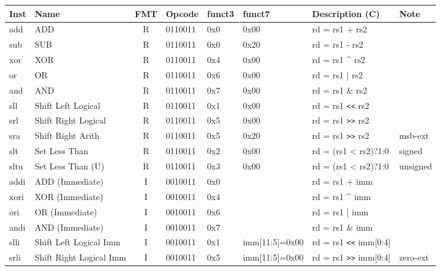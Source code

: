 \begin{tabular}
{T | l | c | T | T | T | T | l} \hline
\rm Inst & Name                    & FMT & \rm Opcode & \rm funct3 & \rm funct7 & \rm Description (C)  & Note \\ \hline
add      & ADD                     & R   & 0110011    & 0x0    & 0x00   & rd = rs1 + rs2               & \\
sub      & SUB                     & R   & 0110011    & 0x0    & 0x20   & rd = rs1 - rs2               & \\
xor      & XOR                     & R   & 0110011    & 0x4    & 0x00   & rd = rs1 \^{} rs2            & \\
or       & OR                      & R   & 0110011    & 0x6    & 0x00   & rd = rs1 | rs2               & \\
and      & AND                     & R   & 0110011    & 0x7    & 0x00   & rd = rs1 \& rs2              & \\
sll      & Shift Left Logical      & R   & 0110011    & 0x1    & 0x00   & rd = rs1 \verb|<<| rs2       & \\
srl      & Shift Right Logical     & R   & 0110011    & 0x5    & 0x00   & rd = rs1 \verb|>>| rs2       & \\
sra      & Shift Right Arith       & R   & 0110011    & 0x5    & 0x20   & rd = rs1 \verb|>>| rs2       & msb-ext \\
slt      & Set Less Than           & R   & 0110011    & 0x2    & 0x00   & rd = (rs1 < rs2)?1:0         & signed \\
sltu     & Set Less Than (U)       & R   & 0110011    & 0x3    & 0x00   & rd = (rs1 < rs2)?1:0         & unsigned \\ \hline
addi     & ADD (Immediate)         & I   & 0010011    & 0x0    &        & rd = rs1 + imm               & \\
xori     & XOR (Immediate)         & I   & 0010011    & 0x4    &        & rd = rs1 \^{} imm            & \\
ori      & OR (Immediate)          & I   & 0010011    & 0x6    &        & rd = rs1 | imm               & \\
andi     & AND (Immediate)         & I   & 0010011    & 0x7    &        & rd = rs1 \& imm              & \\
slli     & Shift Left Logical Imm  & I   & 0010011    & 0x1    & imm[11:5]=0x00 & rd = rs1 \verb|<<| imm[0:4]  & \\
srli     & Shift Right Logical Imm & I   & 0010011    & 0x5    & imm[11:5]=0x00 & rd = rs1 \verb|>>| imm[0:4]  & zero-ext \\

\end{tabular}
